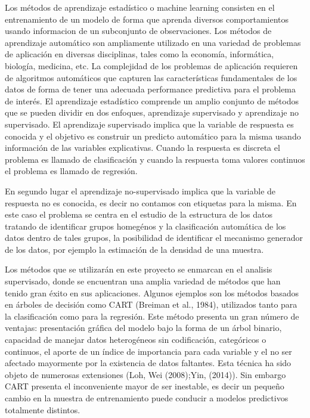 \documentclass[msc,oneside,a4paper]{udelar}\usepackage[]{graphicx}\usepackage[]{color}
\begin{document}
Los métodos de aprendizaje estadístico o machine learning consisten en el entrenamiento de un modelo de forma que aprenda diversos comportamientos usando informacion de un subconjunto de observaciones. Los métodos de aprendizaje automático son ampliamente utilizado en una variedad de problemas de aplicación en diversas disciplinas, tales como la economía, informática, biología, medicina, etc. La complejidad de los problemas de aplicación requieren de algoritmos automáticos que capturen las características fundamentales de los datos de forma de tener una adecuada performance predictiva para el problema de interés. El aprendizaje estadístico comprende un amplio conjunto de métodos que se pueden dividir en dos enfoques, aprendizaje supervisado y aprendizaje no supervisado. El aprendizaje supervisado implica que la variable de respuesta es conocida y el objetivo es construir un predicto automático para la misma usando información de las variables explicativas. Cuando la respuesta es discreta el problema es llamado de clasificación y cuando la respuesta toma valores continuos el problema es llamado de regresión.

En segundo lugar el aprendizaje no-supervisado implica que la variable de respuesta no es conocida, es decir no contamos con etiquetas para la misma. En este caso el problema se centra en el estudio de la estructura de los datos tratando de identificar grupos homegénos y la clasificación automática de los datos dentro de tales grupos, la posibilidad de identificar el mecanismo generador de los datos, por ejemplo la estimación de la densidad de una muestra. 

Los métodos que se utilizarán en este proyecto se enmarcan en el analisis supervisado, donde se encuentran una amplia variedad de métodos que han tenido gran éxito en sus aplicaciones. Algunos ejemplos son los métodos basados en árboles de decisión como CART (Breiman et al., 1984), utilizados tanto para la clasificación como para la regresión. Este método presenta un gran número de ventajas: presentación gráfica del modelo bajo la forma de un árbol binario, capacidad de manejar datos heterogéneos sin codificación, categóricos o continuos, el aporte de un índice de importancia para cada variable y el no ser afectado mayormente por la existencia de datos faltantes. Esta técnica ha sido objeto de numerosas extensiones (Loh, Wei (2008);Yin, (2014)). Sin embargo CART presenta el inconveniente mayor de ser inestable, es decir un pequeño cambio en la muestra de entrenamiento puede conducir a modelos predictivos totalmente distintos.
\end{document}
